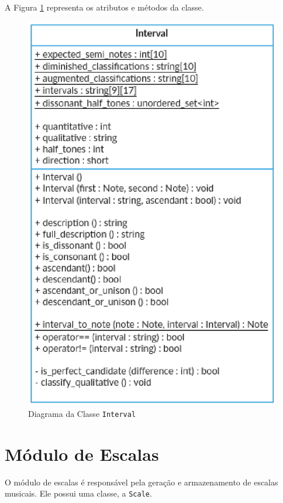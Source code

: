       A Figura \ref{intervalclass} representa os atributos e métodos da classe.

      \begin{figure}[htb]
        \centering
        \includegraphics[scale=0.7]{figuras/intervalclass.eps}
        \caption{Diagrama da Classe \texttt{Interval}}
        \label{intervalclass}
      \end{figure}

  \section[Módulo de Escalas]{Módulo de Escalas}

    O módulo de escalas é responsável pela geração e armazenamento de escalas musicais. Ele possui uma classe, a \texttt{Scale}.

